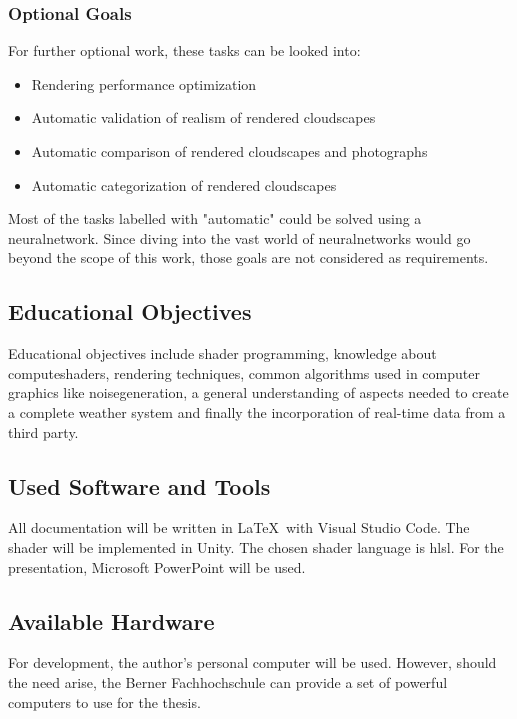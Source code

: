 \subsubsection{Optional Goals}
\label{section:goals:optional}
For further optional work, these tasks can be looked into:
\begin{itemize}
    \item Rendering performance optimization
    \item Automatic validation of realism of rendered cloudscapes
    \item Automatic comparison of rendered cloudscapes and photographs
    \item Automatic categorization of rendered cloudscapes
\end{itemize}

\noindent
Most of the tasks labelled with "automatic" could be solved using a \gls{neuralnetwork}.
Since diving into the vast world of \gls{neuralnetwork}s would go beyond the scope of this work, those goals are not considered as requirements.

\subsection{Educational Objectives}
Educational objectives include \gls{shader} programming, knowledge about \gls{computeshader}s, rendering techniques, common algorithms used in computer graphics like \gls{noisegeneration}, a general understanding of aspects needed to create a complete weather system and finally the incorporation of real-time data from a third party.

\subsection{Used Software and Tools}
All documentation will be written in \LaTeX\  with Visual Studio Code.
The \gls{shader} will be implemented in Unity. The chosen \gls{shader} language is \gls{hlsl}.
For the presentation, Microsoft PowerPoint will be used.

\subsection{Available Hardware}
For development, the author's personal computer will be used. However, should the need arise, the Berner Fachhochschule can provide a set of powerful computers to use for the thesis.